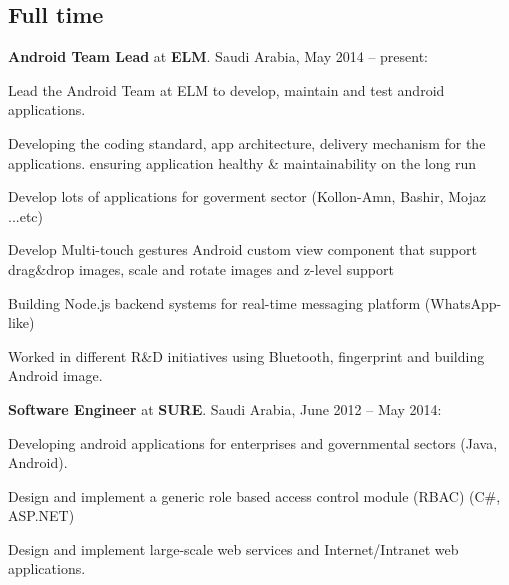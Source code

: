 \documentclass[letterpaper]{article}
\renewenvironment{itemize}{
  \begin{list}{}{
    \setlength{\leftmargin}{1.5em}
  }
}{
  \end{list}
}
\begin{document}
\subsection*{Full time}
\begin{itemize}

\item \textbf{Android Team Lead} at \textbf{ELM}.  Saudi Arabia, May 2014 -- present:
\begin{itemize}
\item Lead the Android Team at ELM to develop, maintain and test android applications.
\item Developing the coding standard, app architecture, delivery mechanism for the applications. ensuring application healthy \& maintainability on the long run
\item Develop lots of applications for goverment sector (Kollon-Amn, Bashir, Mojaz ...etc)
\item Develop Multi-touch gestures Android custom view component that support drag\&drop images, scale and rotate images and z-level support
\item Building Node.js backend systems for real-time messaging platform (WhatsApp-like)
\item Worked in different R\&D initiatives using Bluetooth, fingerprint and building Android image.
\end{itemize}

\item \textbf{Software Engineer} at \textbf{SURE}.  Saudi Arabia, June 2012 -- May 2014:
\begin{itemize}
\item Developing android applications for enterprises and governmental sectors (Java, Android).
\item Design and implement a generic role based access control module (RBAC) (C\#, ASP.NET)
\item Design and implement large-scale web services and Internet/Intranet web applications.
\end{itemize}


\end{itemize}
\end{document}
